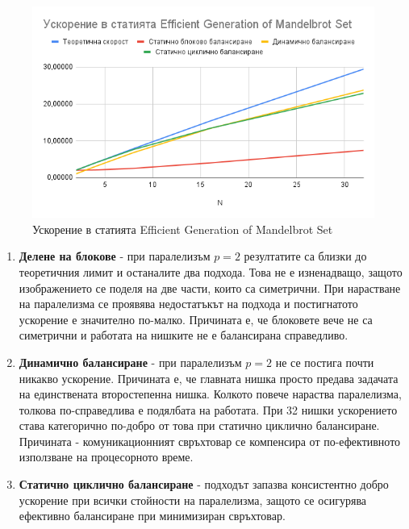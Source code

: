 \documentclass[a4paper,11pt]{article}
\begin{document}
\begin{figure}[H]
    \centering
    \includegraphics[width=0.9\linewidth]{images/Efficient Generation of Mandelbrot Set.png}
    \caption{Ускорение в статията Efficient Generation of Mandelbrot Set}
    \label{fig:efficient-generation}
\end{figure}
\begin{enumerate}
    \item \textbf{Делене на блокове} - при паралелизъм $p=2$ резултатите са близки до теоретичния лимит и останалите два подхода. Това не е изненадващо, защото изображението се поделя на две части, които са симетрични. При нарастване на паралелизма се проявява недостатъкът на подхода и постигнатото ускорение е значително по-малко. Причината е, че блоковете вече не са симетрични и работата на нишките не е балансирана справедливо. 
    \item \textbf{Динамично балансиране} - при паралелизъм $p=2$ не се постига почти никакво ускорение. Причината е, че главната нишка просто предава задачата на единствената второстепенна нишка. Колкото повече нараства паралелизма, толкова по-справедлива е подялбата на работата. При 32 нишки ускорението става категорично по-добро от това при статично циклично балансиране. Причината - комуникационният свръхтовар се компенсира от по-ефективното използване на процесорното време. 
    \item \textbf{Статично циклично балансиране} - подходът запазва консистентно добро ускорение при всички стойности на паралелизма, защото се осигурява ефективно балансиране при минимизиран свръхтовар. 
\end{enumerate} 
\end{document}
